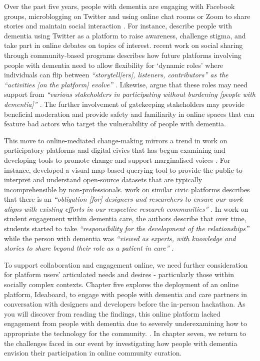 Over the past five years, people with dementia are engaging with Facebook groups, microblogging on Twitter and using online chat rooms or Zoom to share stories and maintain social interaction \citep{lazar_safe_2019}. For instance, \cite{talbot_how_2020} describe people with dementia using Twitter as a platform to raise awareness, challenge stigma, and take part in online debates on topics of interest. \cite{dai2020making} recent work on social sharing through community-based programs describes how future platforms involving people with dementia need to allow flexibility for `dynamic roles' where individuals can flip between \textit{``storytell[ers], listeners, contributors'' as the ``activities [on the platform] evolve'' \citep[pg. 10]{dai2020making}}. Likewise, \cite{johnson2020roles} argue that these roles may need support from \textit{``various stakeholders in participating without burdening [people with dementia]'' \citep[pg. 127]{johnson2020roles}}. The further involvement of gatekeeping stakeholders may provide beneficial moderation and provide safety and familiarity in online spaces that can feature bad actors who target the vulnerability of people with dementia. 

This move to online-mediated change-making mirrors a trend in work on participatory platforms and digital civics that has begun examining and developing tools to promote change and support marginalised voices \citep{corbett_exploring_2018}. For instance, \cite{puussaar_making_2018} developed a visual map-based querying tool to provide the public to interpret and understand open-source datasets that are typically incomprehensible by non-professionals. \cite{asad_tap_2017} work on similar civic platforms describes that there is an \textit{``obligation [for] designers and researchers to ensure our work aligns with existing efforts in our respective research communities'' \citep[pg. 6314]{asad_tap_2017}}. In \cite{foley_student_2020} work on student engagement within dementia care, the authors describe that over time, students started to take \textit{``responsibility for the development of the relationships''} while the person with dementia was \textit{``viewed as experts, with knowledge and stories to share beyond their role as a patient in care'' \citep[pg. 9]{foley_student_2020}}. 

To support collaboration and engagement online, we need further consideration for platform users’ articulated needs and desires - particularly those within socially complex contexts. Chapter five explores the deployment of an online platform, Ideaboard, to engage with people with dementia and care partners in conversation with designers and developers before the in-person hackathon. As you will discover from reading the findings, this online platform lacked engagement from people with dementia due to severely underexamining how to appropriate the technology for the community. \citep{lindqvist2018contrasting}. In chapter seven, we return to the challenges faced in our event by investigating how people with dementia envision their participation in online community curation.

